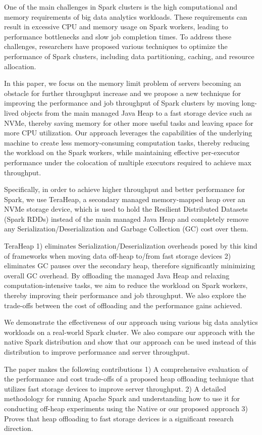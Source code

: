 \documentclass[twocolumn,10pt]{asme2e}
\begin{document}
One of the main challenges in Spark clusters is the high computational and memory requirements of big data analytics workloads. These requirements can result in excessive CPU and memory usage on Spark workers, leading to performance bottlenecks and slow job completion times. To address these challenges, researchers have proposed various techniques to optimize the performance of Spark clusters, including data partitioning, caching, and resource allocation.

In this paper, we focus on the memory limit problem of servers becoming an obstacle for further throughput increase and we propose a new technique for improving the performance and job throughput of Spark clusters by moving long-lived objects from the main managed Java Heap to a fast storage device such as NVMe, thereby saving memory for other more useful tasks and leaving space for more CPU utilization. Our approach leverages the capabilities of the underlying machine to create less memory-consuming computation tasks, thereby reducing the workload on the Spark workers, while maintaining effective per-executor performance under the colocation of multiple executors required to achieve max throughput.

Specifically, in order to achieve higher throughput and better performance for Spark, we use TeraHeap, a secondary managed memory-mapped heap over an NVMe storage device, which is used to hold the Resilient Distributed Datasets (Spark RDDs) instead of the main managed Java Heap and completely remove any Serialization/Deserialization and Garbage Collection (GC) cost over them.

TeraHeap 1) eliminates Serialization/Deserialization overheads posed by this kind of frameworks when moving data off-heap to/from fast storage devices 2) eliminates GC pauses over the secondary heap, therefore significantly minimizing overall GC overhead. By offloading the managed Java Heap and relaxing computation-intensive tasks, we aim to reduce the workload on Spark workers, thereby improving their performance and job throughput. We also explore the trade-offs between the cost of offloading and the performance gains achieved.

We demonstrate the effectiveness of our approach using various big data analytics workloads on a real-world Spark cluster. We also compare our approach with the native Spark distribution and show that our approach can be used instead of this distribution to improve performance and server throughput.

The paper makes the following contributions 1) A comprehensive evaluation of the performance and cost trade-offs of a proposed heap offloading technique that utilizes fast storage devices to improve server throughput. 2) A detailed methodology for running Apache Spark and understanding how to use it for conducting off-heap experiments using the Native or our proposed approach 3) Proves that heap offloading to fast storage devices is a significant research direction.
\end{document}
